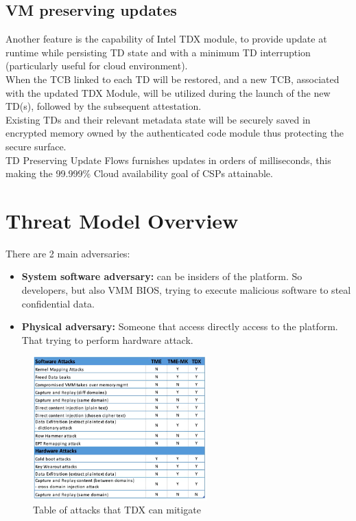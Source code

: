 \subsection{VM preserving updates}
Another feature is the capability of Intel TDX module, to provide
update at runtime while persisting TD state and with a minimum TD
interruption (particularly useful for cloud environment). \\
When the TCB linked to each TD will be restored, and a new TCB,
associated with the updated TDX Module, will be utilized during the
launch of the new TD(s), followed by the subsequent attestation. \\
Existing TDs and their relevant metadata state will be securely saved
in encrypted memory owned by the authenticated code module thus
protecting the secure surface. \\
TD Preserving Update Flows furnishes updates in orders of
milliseconds, this making the 99.999\% Cloud availability goal of CSPs
attainable. \\


\section{Threat Model Overview}
There are 2 main adversaries:
\begin{itemize}
  \item \textbf{System software adversary:}  can be insiders of the
    platform. So developers, but also VMM BIOS, trying to execute
    malicious software to steal confidential data.
  \item \textbf{Physical adversary:} Someone that access directly
    access to the platform. That trying to perform hardware attack.
\end{itemize}

\begin{figure}[H]
  \centering
  \includegraphics[width=0.6\textwidth]{img/tdx attacks table.png}
  \caption{Table of attacks that TDX can mitigate}
  \label{fig:tdx attacks table}
\end{figure}
